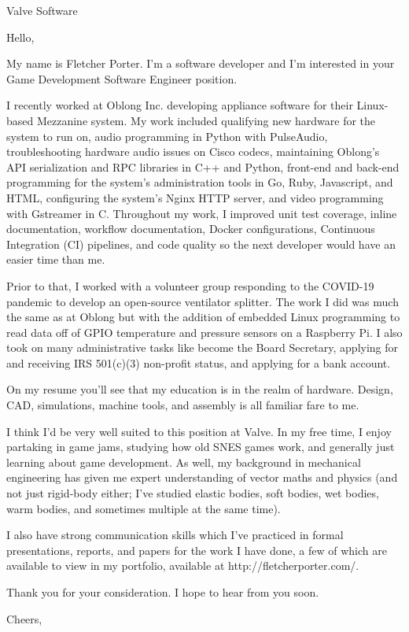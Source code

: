 \documentclass[12pt,american,german,british]{letter}
\begin{document}
\raggedright

\begin{letter}{Valve Software}

\opening{Hello,}

My name is Fletcher Porter.  I'm a software developer and I'm interested in
your Game Development Software Engineer position.

I recently worked at Oblong Inc. developing appliance software for their
Linux-based Mezzanine system.  My work included qualifying new hardware for the
system to run on, audio programming in Python with PulseAudio,
troubleshooting hardware audio issues on Cisco codecs, maintaining Oblong's API
serialization and RPC libraries in C++ and Python, front-end and back-end
programming for the system's administration tools in Go, Ruby, Javascript, and
HTML, configuring the system's Nginx HTTP server, and video programming with
Gstreamer in C.  Throughout my work, I improved unit test coverage, inline
documentation, workflow documentation, Docker configurations, Continuous
Integration (CI) pipelines, and code quality so the next developer would have
an easier time than me.

Prior to that, I worked with a volunteer group responding to the COVID-19
pandemic to develop an open-source ventilator splitter.  The work I did was
much the same as at Oblong but with the addition of embedded Linux programming
to read data off of GPIO temperature and pressure sensors on a Raspberry Pi.  I
also took on many administrative tasks like become the Board Secretary,
applying for and receiving IRS 501(c)(3) non-profit status, and applying for a
bank account.

On my resume you'll see that my education is in the realm of hardware.  Design, 
CAD, simulations, machine tools, and assembly is all familiar fare to me.

I think I'd be very well suited to this position at Valve.  In my free time, I
enjoy partaking in game jams, studying how old SNES games work, and generally
just learning about game development.  As well, my background in mechanical
engineering has given me expert understanding of vector maths and physics (and
not just rigid-body either; I've studied elastic bodies, soft bodies, wet
bodies, warm bodies, and sometimes multiple at the same time).

I also have strong communication skills which I've practiced in formal
presentations, reports, and papers for the work I have done, a few of which are
available to view in my portfolio, available at http://fletcherporter.com/.

Thank you for your consideration.  I hope to hear from you soon.


\closing{Cheers,}

\end{letter}
\end{document}
